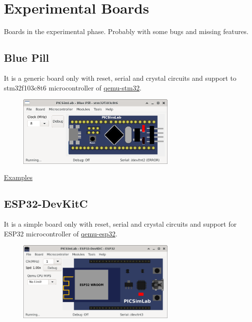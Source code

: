 \chapter{Experimental Boards} \hypertarget{def:eboards}{}

Boards in the experimental phase. Probably with some bugs and missing features. 

\section{Blue Pill}

It is a generic board only with reset, serial and crystal circuits and support to stm32f103c8t6 microcontroller of 
\href{https://beckus.github.io/qemu_stm32/}{qemu-stm32}.

\begin{figure}[H]
\center
\includegraphics[width=0.7\textwidth]{img/Blue_Pill.png} 
\end{figure} 

\href{https://lcgamboa.github.io/picsimlab_examples/board_Blue_Pill.html}{Examples}


\section{ESP32-DevKitC}

It is a simple board only with reset, serial and crystal circuits and support 
for ESP32 microcontroller of \href{https://github.com/a159x36/qemu}{qemu-esp32}.

\begin{figure}[H]
\center
\includegraphics[width=0.7\textwidth]{img/DevKitC.png} 
\end{figure} 

